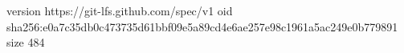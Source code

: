 version https://git-lfs.github.com/spec/v1
oid sha256:e0a7c35db0c473735d61bbf09e5a89cd4e6ae257e98c1961a5ac249e0b779891
size 484
